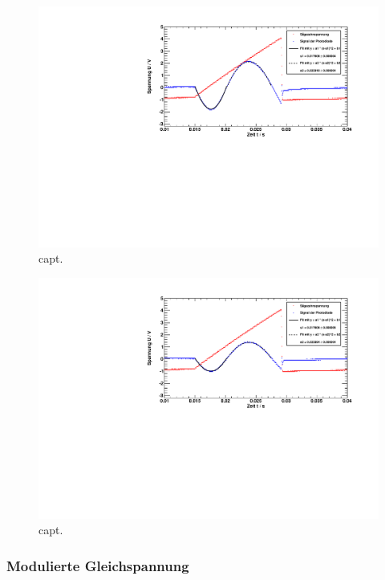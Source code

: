 \begin{figure}[H]
\begin{center}
  \includegraphics[width=15cm]{../img/pock_saege_winkel2.pdf}
  \caption{capt.}
  \label{img:pock_saege_winkel2}
\end{center}
\end{figure}

\begin{figure}[H]
\begin{center}
  \includegraphics[width=15cm]{../img/pock_saege_winkel3.pdf}
  \caption{capt.}
  \label{img:pock_saege_winkel3}
\end{center}
\end{figure}

\subsubsection{Modulierte Gleichspannung}

